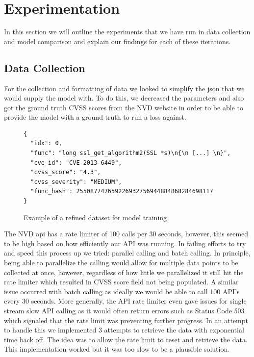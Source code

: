 \documentclass{article}
\begin{document}
\section{Experimentation}
In this section we will outline the experiments that we have run in data collection and model comparison
and explain our findings for each of these iterations. 

\subsection{Data Collection}
For the collection and formatting of data we looked to simplify the json that we would supply the model with. To do this, we decreased the parameters and also got the ground truth CVSS scores from the NVD website in order to be able to provide the model with a ground truth to run a loss against. 

\begin{figure}
\begin{verbatim}
{
  "idx": 0,
  "func": "long ssl_get_algorithm2(SSL *s)\n{\n [...] \n}",
  "cve_id": "CVE-2013-6449",
  "cvss_score": "4.3",
  "cvss_severity": "MEDIUM",
  "func_hash": 255087747659226932756944884868284698117
}
\end{verbatim}
\caption{Example of a refined dataset for model training}
\label{fig:refined_example}
\end{figure}

The NVD api has a rate limiter of 100 calls per 30 seconds, however, this seemed to be high based on how efficiently our API was running. In failing efforts to try and speed this process up we tried: parallel calling and batch calling. In principle, being able to parallelize the calling would allow for multiple data points to be collected at once, however, regardless of how little we parallelized it still hit the rate limiter which resulted in CVSS score field not being populated. A similar issue occurred with batch calling as ideally we would be able to call 100 API's every 30 seconds. More generally, the API rate limiter even gave issues for single stream slow API calling as it would often return errors such as Status Code 503 which signaled that the rate limit was preventing further progress. In an attempt to handle this we implemented 3 attempts to retrieve the data with exponential time back off. The idea was to allow the rate limit to reset and retrieve the data. This implementation worked but it was too slow to be a plausible solution.
\end{document}
